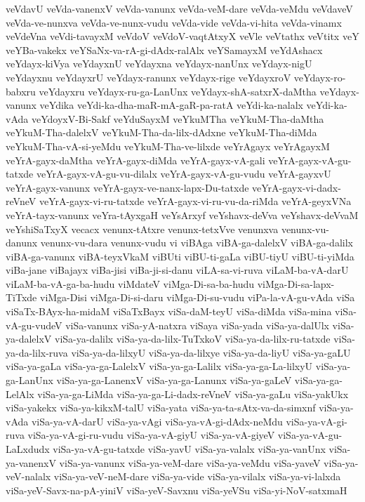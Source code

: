 {veVdavU
veVda-vanenxV
veVda-vanunx
veVda-veM-dare
veVda-veMdu
veVdaveV
veVda-ve-nunxva
veVda-ve-nunx-vudu
veVda-vide
veVda-vi-hita
veVda-vinamx
veVdeVna
veVdi-tavayxM
veVdoV
veVdoV-vaqtAtxyX
veVle
veVtathx
veVtitx
veY
veYBa-vakekx
veYSaNx-va-rA-gi-dAdx-ralAlx
veYSamayxM
veYdAshacx
veYdayx-kiVya
veYdayxnU
veYdayxna
veYdayx-nanUnx
veYdayx-nigU
veYdayxnu
veYdayxrU
veYdayx-ranunx
veYdayx-rige
veYdayxroV
veYdayx-ro-babxru
veYdayxru
veYdayx-ru-ga-LanUnx
veYdayx-shA-satxrX-daMtha
veYdayx-vanunx
veYdika
veYdi-ka-dha-maR-mA-gaR-pa-ratA
veYdi-ka-nalalx
veYdi-ka-vAda
veYdoyxV-Bi-Sakf
veYduSayxM
veYkuMTha
veYkuM-Tha-daMtha
veYkuM-Tha-dalelxV
veYkuM-Tha-da-lilx-dAdxne
veYkuM-Tha-diMda
veYkuM-Tha-vA-si-yeMdu
veYkuM-Tha-ve-lilxde
veYrAgayx
veYrAgayxM
veYrA-gayx-daMtha
veYrA-gayx-diMda
veYrA-gayx-vA-gali
veYrA-gayx-vA-gu-tatxde
veYrA-gayx-vA-gu-vu-dilalx
veYrA-gayx-vA-gu-vudu
veYrA-gayxvU
veYrA-gayx-vanunx
veYrA-gayx-ve-nanx-lapx-Du-tatxde
veYrA-gayx-vi-dadx-reVneV
veYrA-gayx-vi-ru-tatxde
veYrA-gayx-vi-ru-vu-da-riMda
veYrA-geyxVNa
veYrA-tayx-vanunx
veYra-tAyxgaH
veYsArxyf
veYshavx-deVva
veYshavx-deVvaM
veYshiSaTxyX
vecacx
venunx-tAtxre
venunx-tetxVve
venunxva
venunx-vu-danunx
venunx-vu-dara
venunx-vudu
vi
viBAga
viBA-ga-dalelxV
viBA-ga-dalilx
viBA-ga-vanunx
viBA-teyxVkaM
viBUti
viBU-ti-gaLa
viBU-tiyU
viBU-ti-yiMda
viBa-jane
viBajayx
viBa-jisi
viBa-ji-si-danu
viLA-sa-vi-ruva
viLaM-ba-vA-darU
viLaM-ba-vA-ga-ba-hudu
viMdateV
viMga-Di-sa-ba-hudu
viMga-Di-sa-lapx-TiTxde
viMga-Disi
viMga-Di-si-daru
viMga-Di-su-vudu
viPa-la-vA-gu-vAda
viSa
viSaTx-BAyx-ha-midaM
viSaTxBayx
viSa-daM-teyU
viSa-diMda
viSa-mina
viSa-vA-gu-vudeV
viSa-vanunx
viSa-yA-natxra
viSaya
viSa-yada
viSa-ya-dalUlx
viSa-ya-dalelxV
viSa-ya-dalilx
viSa-ya-da-lilx-TuTxkoV
viSa-ya-da-lilx-ru-tatxde
viSa-ya-da-lilx-ruva
viSa-ya-da-lilxyU
viSa-ya-da-lilxye
viSa-ya-da-liyU
viSa-ya-gaLU
viSa-ya-gaLa
viSa-ya-ga-LalelxV
viSa-ya-ga-Lalilx
viSa-ya-ga-La-lilxyU
viSa-ya-ga-LanUnx
viSa-ya-ga-LanenxV
viSa-ya-ga-Lanunx
viSa-ya-gaLeV
viSa-ya-ga-LelAlx
viSa-ya-ga-LiMda
viSa-ya-ga-Li-dadx-reVneV
viSa-ya-gaLu
viSa-yakUkx
viSa-yakekx
viSa-ya-kikxM-talU
viSa-yata
viSa-ya-ta-sAtx-va-da-simxnf
viSa-ya-vAda
viSa-ya-vA-darU
viSa-ya-vAgi
viSa-ya-vA-gi-dAdx-neMdu
viSa-ya-vA-gi-ruva
viSa-ya-vA-gi-ru-vudu
viSa-ya-vA-giyU
viSa-ya-vA-giyeV
viSa-ya-vA-gu-LaLxdudx
viSa-ya-vA-gu-tatxde
viSa-yavU
viSa-ya-valalx
viSa-ya-vanUnx
viSa-ya-vanenxV
viSa-ya-vanunx
viSa-ya-veM-dare
viSa-ya-veMdu
viSa-yaveV
viSa-ya-veV-nalalx
viSa-ya-veV-neM-dare
viSa-ya-vide
viSa-ya-vilalx
viSa-ya-vi-lalxda
viSa-yeV-Savx-na-pA-yiniV
viSa-yeV-Savxnu
viSa-yeVSu
viSa-yi-NoV-satxmaH
}
